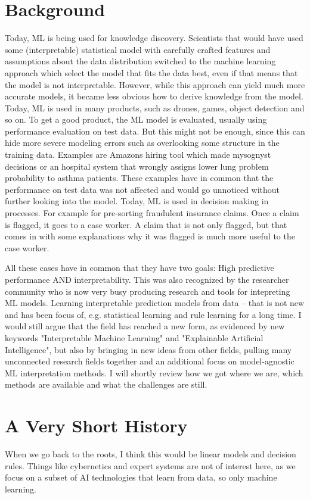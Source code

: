 \documentclass[runningheads]{llncs}
\begin{document}
\section{Background}
Today, ML is being used for knowledge discovery.
Scientists that would have used some (interpretable) statistical model with carefully crafted features and assumptions about the data distribution switched to the machine learning approach which select the model that fits the data best, even if that means that the model is not interpretable.
However, while this approach can yield much more accurate models, it became less obvious how to derive knowledge from the model.
Today, ML is used in many products, such as drones, games, object detection and so on.
To get a good product, the ML model is evaluated, usually using performance evaluation on test data.
But this might not be enough, since this can hide more severe modeling errors such as overlooking some structure in the training data.
Examples are Amazons hiring tool which made mysognyst decisions or an hospital system that wrongly assigns lower lung problem probability to asthma patients.
These examples have in common that the performance on test data was not affected and would go unnoticed without further looking into the model.
Today, ML is used in decision making in processes.
For example for pre-sorting fraudulent insurance claims.
Once a claim is flagged, it goes to a case worker.
A claim that is not only flagged, but that comes in with some explanations why it was flagged is much more useful to the case worker.

All these cases have in common that they have two goals: High predictive performance AND interpretability.
This was also recognized by the researcher community who is now very busy producing research and tools for intepreting ML models.
Learning interpretable prediction models from data -- that is not new and has been focus of, e.g. statistical learning and rule learning for a long time.
I would still argue that the field has reached a new form, as evidenced by new keywords "Interpretable Machine Learning" and "Explainable Artificial Intelligence", but also by bringing in new ideas from other fields, pulling many unconnected research fields together and an additional focus on model-agnostic ML interpretation methods.
I will shortly review how we got where we are, which methods are available and what the challenges are still.



\section{A Very Short History}
When we go back to the roots, I think this would be linear models and decision rules.
Things like cybernetics and expert systems are not of interest here, as we focus on a subset of AI technologies that learn from data, so only machine learning.
\end{document}
